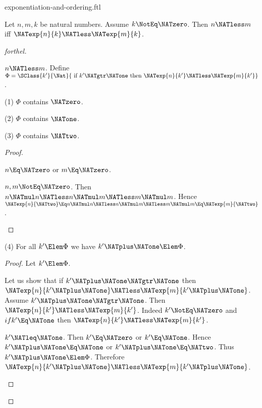 \documentclass{stex}
\begin{document}
\begin{smodule}{exponentiation-and-ordering.ftl}

\begin{proposition}[forthel]
  Let $n, m, k$ be natural numbers.
  Assume $k \NotEq \NATzero$.
  Then $n \NATless m$ iff $\NATexp{n}{k} \NATless \NATexp{m}{k}$.
\end{proposition}
\begin{proof}[forthel]
  \begin{case}{$n \NATless m$.}
    Define $\Phi = \SClass{k'}{\Nat}{\text{ if }k' \NATgtr \NATone\text{ then }\NATexp{n}{k'} \NATless \NATexp{m}{k'}}$.

    (1) $\Phi$ contains $\NATzero$.

    (2) $\Phi$ contains $\NATone$.

    (3) $\Phi$ contains $\NATtwo$.
    \begin{proof}
      \begin{case}{$n \Eq \NATzero$ or $m \Eq \NATzero$.} \end{case}

      \begin{case}{$n, m \NotEq \NATzero$.}
        Then $n \NATmul n
          \NATless n \NATmul m
          \NATless m \NATmul m$.
        Hence $\NATexp{n}{\NATtwo}
          \Eq n \NATmul n
          \NATless n \NATmul m
          \NATless m \NATmul m
          \Eq \NATexp{m}{\NATtwo}$.
      \end{case}
    \end{proof}

    (4) For all $k' \Elem \Phi$ we have $k' \NATplus \NATone \Elem \Phi$.
    \begin{proof}
      Let $k' \Elem \Phi$.

      Let us show that if $k' \NATplus \NATone \NATgtr \NATone$ then $\NATexp{n}{k' \NATplus \NATone} \NATless \NATexp{m}{k' \NATplus \NATone}$.
        Assume $k' \NATplus \NATone \NATgtr \NATone$.
        Then $\NATexp{n}{k'} \NATless \NATexp{m}{k'}$.
        Indeed $k' \NotEq \NATzero$ and $if k' \Eq \NATone$ then $\NATexp{n}{k'} \NATless \NATexp{m}{k'}$.

        \begin{case}{$k' \NATleq \NATone$.}
          Then $k' \Eq \NATzero$ or $k' \Eq \NATone$.
          Hence $k' \NATplus \NATone \Eq \NATone$ or $k' \NATplus \NATone \Eq \NATtwo$.
          Thus $k' \NATplus \NATone \Elem \Phi$.
          Therefore $\NATexp{n}{k' \NATplus \NATone} \NATless \NATexp{m}{k' \NATplus \NATone}$.
        \end{case}


\end{proof}
\end{case}
\end{proof}
\end{smodule}
\end{document}
